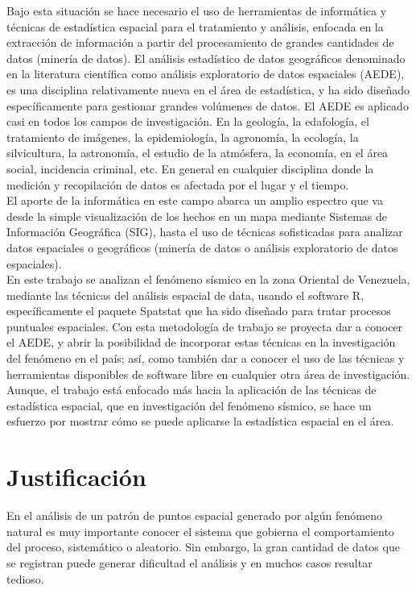 \documentclass[12pt]{report}
\begin{document}
Bajo esta situación se hace necesario el uso de herramientas de informática y técnicas de estadística espacial para el tratamiento y análisis, enfocada en la extracción de información a partir del procesamiento de grandes cantidades de datos (minería de datos).
El análisis estadístico de datos geográficos denominado en la literatura científica como análisis exploratorio de datos espaciales (AEDE), es una disciplina relativamente nueva en el área de estadística, y ha sido diseñado específicamente para gestionar grandes volúmenes de datos. El AEDE es aplicado casi en todos los campos de investigación. En la geología, la edafología, el tratamiento de imágenes, la epidemiología, la agronomía, la ecología, la silvicultura, la astronomía, el estudio de la atmósfera, la economía, en el área social, incidencia criminal, etc. En general en cualquier disciplina donde la medición y recopilación de datos es afectada por el lugar y el tiempo. \\

El aporte de la informática en este campo abarca un amplio espectro que va desde la simple visualización de los hechos en un mapa mediante Sistemas de Información Geográfica (SIG), hasta el uso de técnicas sofisticadas para analizar datos espaciales o geográficos (minería de datos o análisis exploratorio de datos espaciales).\\

En este trabajo se analizan el fenómeno sísmico en la zona Oriental de Venezuela, mediante las técnicas del análisis espacial de data, usando el software R, específicamente el paquete Spatstat  que ha sido diseñado para tratar procesos puntuales espaciales. Con esta metodología de trabajo se proyecta dar a conocer el AEDE, y abrir la posibilidad de incorporar estas técnicas en la investigación del fenómeno en el país; así, como también dar a conocer el uso de las técnicas y herramientas disponibles de software libre en  cualquier otra área de investigación. Aunque, el trabajo está enfocado más hacia la aplicación de las técnicas de estadística espacial, que en investigación del fenómeno sísmico, se hace un esfuerzo por mostrar cómo se puede aplicarse la estadística espacial en el área.

	
	
	\section{Justificación}



En el análisis de un patrón de puntos espacial generado por algún fenómeno natural es muy importante conocer el sistema que gobierna el comportamiento del proceso, sistemático o aleatorio. Sin embargo, la gran cantidad de datos que se registran puede generar dificultad el análisis y en muchos casos resultar tedioso. 
\end{document}
